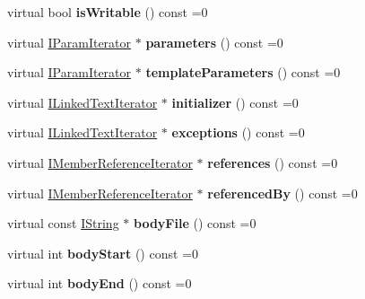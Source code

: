 \begin{DoxyCompactItemize}
virtual bool {\bfseries is\+Writable} () const =0
\item 
\mbox{\label{class_i_member_ae503c16b26b3237de63360334a3d3dc1}} 
virtual \mbox{\hyperlink{class_i_param_iterator}{I\+Param\+Iterator}} $\ast$ {\bfseries parameters} () const =0
\item 
\mbox{\label{class_i_member_a97b3e3e227f761e487cb88984c5ef138}} 
virtual \mbox{\hyperlink{class_i_param_iterator}{I\+Param\+Iterator}} $\ast$ {\bfseries template\+Parameters} () const =0
\item 
\mbox{\label{class_i_member_a0086bf38ebcd9b4ab38184848a962618}} 
virtual \mbox{\hyperlink{class_i_linked_text_iterator}{I\+Linked\+Text\+Iterator}} $\ast$ {\bfseries initializer} () const =0
\item 
\mbox{\label{class_i_member_a7ed235ada7fb119eeed374d2579ba8c8}} 
virtual \mbox{\hyperlink{class_i_linked_text_iterator}{I\+Linked\+Text\+Iterator}} $\ast$ {\bfseries exceptions} () const =0
\item 
\mbox{\label{class_i_member_afa780eb808fdf432cf520834da5301c1}} 
virtual \mbox{\hyperlink{class_i_member_reference_iterator}{I\+Member\+Reference\+Iterator}} $\ast$ {\bfseries references} () const =0
\item 
\mbox{\label{class_i_member_adb91bddf548f3ba728d20873ce50ec0b}} 
virtual \mbox{\hyperlink{class_i_member_reference_iterator}{I\+Member\+Reference\+Iterator}} $\ast$ {\bfseries referenced\+By} () const =0
\item 
\mbox{\label{class_i_member_ab1bb32a7d83ebb8b8150d0e638a646a1}} 
virtual const \mbox{\hyperlink{class_i_string}{I\+String}} $\ast$ {\bfseries body\+File} () const =0
\item 
\mbox{\label{class_i_member_a2ce93188bc859187e86f8d428156c6f9}} 
virtual int {\bfseries body\+Start} () const =0
\item 
\mbox{\label{class_i_member_aac0f158429705055379c9fbe20238144}} 
virtual int {\bfseries body\+End} () const =0
\item 

\end{DoxyCompactItemize}

